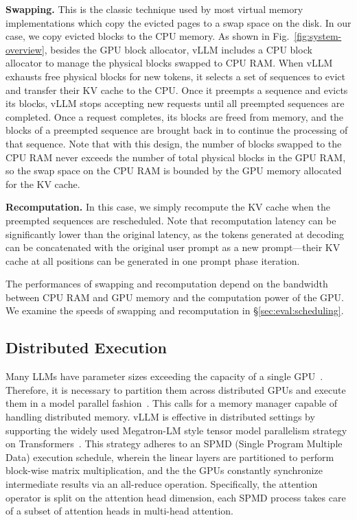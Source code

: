 \textbf{Swapping.} This is the classic technique used by most virtual memory implementations which copy the evicted pages to a swap space on the disk. In our case, we copy evicted blocks to the CPU memory. As shown in Fig.~\ref{fig:system-overview}, besides the GPU block allocator, vLLM includes a CPU block allocator to manage the physical blocks swapped to CPU RAM. When vLLM exhausts free physical blocks for new tokens, it selects a set of sequences to evict and transfer their KV cache to the CPU. Once it preempts a sequence and evicts its blocks, vLLM stops accepting new requests until all preempted sequences are completed. Once a request completes, its blocks are freed from memory, and the blocks of a preempted sequence are brought back in to continue the processing of that sequence. Note that with this design, the number of blocks swapped to the CPU RAM never exceeds the number of total physical blocks in the GPU RAM, so the swap space on the CPU RAM is bounded by the GPU memory allocated for the KV cache. 

\textbf{Recomputation.} In this case, we simply recompute the KV cache when the preempted sequences are rescheduled. Note that recomputation latency can be significantly lower than the original latency, as the tokens generated at decoding can be concatenated with the original user prompt as a new prompt---their KV cache at all positions can be generated in one prompt phase iteration.

The performances of swapping and recomputation depend on the bandwidth between CPU RAM and GPU memory and the computation power of the GPU. We examine the speeds of swapping and recomputation in \S\ref{sec:eval:scheduling}.

\subsection{Distributed Execution}
\label{sec:distributed}
Many LLMs have parameter sizes exceeding the capacity of a single GPU~\cite{brown2020language, chowdhery2022palm}. Therefore, it is necessary to partition them across distributed GPUs and execute them in a model parallel fashion~\cite{zheng2022alpa, li2023alpaserve}. This calls for a memory manager capable of handling distributed memory. vLLM is effective in distributed settings by supporting the widely used Megatron-LM style tensor model parallelism strategy on Transformers~\cite{shoeybi2019megatron}. This strategy adheres to an SPMD (Single Program Multiple Data) execution schedule, wherein the linear layers are partitioned to perform block-wise matrix multiplication, and the the GPUs constantly synchronize intermediate results via an all-reduce operation. Specifically, the attention operator is split on the attention head dimension, each SPMD process takes care of a subset of attention heads in multi-head attention.

